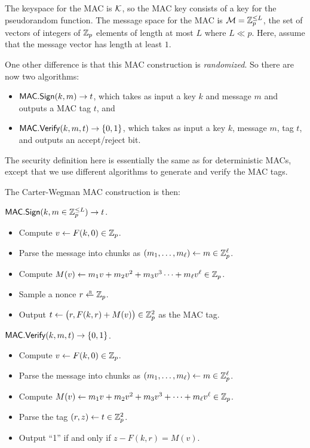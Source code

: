 The keyspace for the MAC is $\mathcal{K}$, so the MAC key consists of a key for 
the pseudorandom function.
The message space for the MAC is $\mathcal{M} = \mathbb{Z}_p^{\leq L}$,
the set of vectors of integers of $\mathbb{Z}_p$ elements of length
at most $L$ where $L \ll p$.
Here, assume that the message vector has length at least $1$.

One other difference is that this MAC construction is 
\emph{randomized}. So there are now two algorithms:
\begin{itemize}
  \item $\mathsf{MAC.Sign}(k, m) \to t$, which takes as input a key $k$ and message $m$
        and outputs a MAC tag $t$, and 
  \item $\mathsf{MAC.Verify}(k, m, t) \to \{0,1\}$, which takes as input a key $k$,
    message $m$, tag $t$, and outputs an accept/reject bit.
\end{itemize}
The security definition here is essentially the same as for deterministic MACs,
except that we use different algorithms to generate and verify the MAC tags.

The Carter-Wegman MAC construction is then:

\medskip
\noindent
$\mathsf{MAC.Sign}(k, m \in \mathbb{Z}^{\leq L}_p) \to t$.
\begin{itemize}[noitemsep]
  \item Compute $v \gets F(k, 0) \in \mathbb{Z}_p$.
  \item Parse the message into chunks as $(m_1, \dots, m_{\ell}) \gets m \in \mathbb{Z}_p^\ell$.
  \item Compute $M(v) \gets m_1 v + m_2 v^2 + m_3 v^3 \cdots + m_{\ell} v^{\ell} \in \mathbb{Z}_p$. \\
  \item Sample a nonce $r \getsr \Z_p$.
  \item Output $t \gets \big(r, F(k, r) + M(v)\big) \in \mathbb{Z}^2_p$ as the MAC tag.
\end{itemize}

\medskip
\noindent
$\mathsf{MAC.Verify}(k, m, t) \to \{0,1\}$.
\begin{itemize}[noitemsep]
  \item Compute $v \gets F(k, 0) \in \mathbb{Z}_p$.
  \item Parse the message into chunks as $(m_1, \dots, m_{\ell}) \gets m \in \mathbb{Z}_p^\ell$.
  \item Compute $M(v) \gets m_1 v + m_2 v^2 + m_3 v^3 + \cdots + m_{\ell} v^{\ell}\in \mathbb{Z}_p$. \\
  \item Parse the tag $(r, z) \gets t \in \mathbb{Z}^2_p$.
  \item Output ``1'' if and only if $z - F(k, r) = M(v)$. 
\end{itemize}



